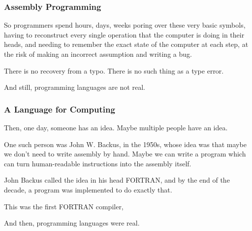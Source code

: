 \documentclass[aspectratio=169]{beamer}
\begin{document}
\begin{frame}[fragile]
  \frametitle{Assembly Programming}

  So programmers spend hours, days, weeks poring over these very basic symbols,
  having to reconstruct every single operation that the computer is doing in their
  heads, and needing to remember the exact state of the computer at each step,
  at the risk of making an incorrect assumption and writing a bug.

  \pause
  \vspace{\fill}

  There is no recovery from a typo. There is no such thing as a type error.

  \pause
  \vspace{\fill}

  And still, programming languages are not real.
\end{frame}

\begin{frame}[fragile]
  \frametitle{A Language for Computing}

  Then, one day, someone has an idea. Maybe multiple people have an idea.

  \pause
  \vspace{\fill}

  One such person was John W. Backus, in the 1950s, whose idea was that
  maybe we don't need to write assembly by hand. Maybe we can write
  a program which can turn human-readable instructions into the assembly
  itself.

  \pause
  \vspace{\fill}

  John Backus called the idea in his head FORTRAN, and by the end of the decade,
  a program was implemented to do exactly that.

  \pause
  \vspace{\fill}

  This was the first FORTRAN compiler,

  \pause
  \vspace{\fill}

  And then, programming languages were real.
\end{frame}

\end{document}
